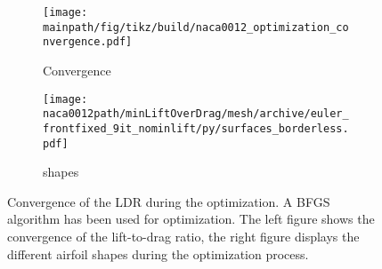 \documentclass[../main.tex]{subfiles}
\def\naca0012path{/home/lukas/Desktop/project/independence/project/simulations/naca0012}
\begin{document}
\begin{figure}[t!]
    \centering
    	\begin{subfigure}[t]{0.45\textwidth}
    	\texttt{[image: \\mainpath/fig/tikz/build/naca0012\_optimization\_convergence.pdf]}
    	\caption{Convergence}
    	\end{subfigure}
    	\begin{subfigure}[t]{0.45\textwidth}
    	\texttt{[image: \\naca0012path/minLiftOverDrag/mesh/archive/euler\_frontfixed\_9it\_nominlift/py/surfaces\_borderless.pdf]}
    	\caption{shapes}
    	\end{subfigure}
    	\caption[NACA0012 LDR optimization - convergence]{Convergence of the \ac{LDR} during the optimization. A \ac{BFGS} algorithm has been used for optimization. The left figure shows the convergence of the lift-to-drag ratio, the right figure displays the different airfoil shapes during the optimization process.}
    \label{fig:nac0012_ldr_convergence}
\end{figure}

\end{document}

